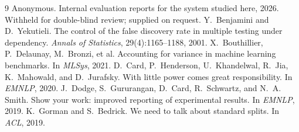 \documentclass{article}
\begin{document}

\begin{thebibliography}{9}
 Anonymous. Internal evaluation reports for the system studied here, 2026. Withheld for double-blind review; supplied on request.
 Y.~Benjamini and D.~Yekutieli. The control of the false discovery rate in multiple testing under dependency. \emph{Annals of Statistics}, 29(4):1165--1188, 2001.
 X.~Bouthillier, P.~Delaunay, M.~Bronzi, et al. Accounting for variance in machine learning benchmarks. In \emph{MLSys}, 2021.
 D.~Card, P.~Henderson, U.~Khandelwal, R.~Jia, K.~Mahowald, and D.~Jurafsky. With little power comes great responsibility. In \emph{EMNLP}, 2020.
 J.~Dodge, S.~Gururangan, D.~Card, R.~Schwartz, and N.~A. Smith. Show your work: improved reporting of experimental results. In \emph{EMNLP}, 2019.
 K.~Gorman and S.~Bedrick. We need to talk about standard splits. In \emph{ACL}, 2019.
\end{thebibliography}
\end{document}
